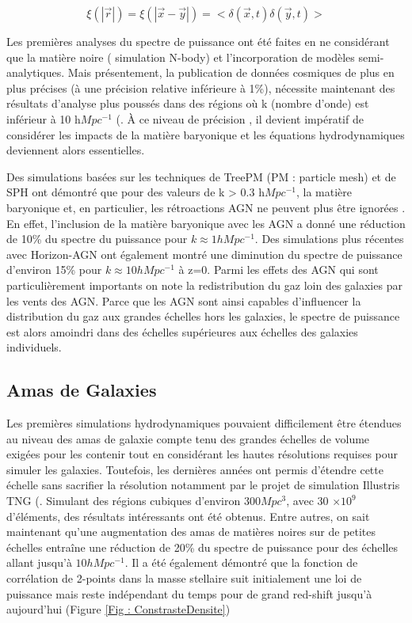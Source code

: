 \documentclass{article}
\begin{document}
\[ \xi(|\overrightarrow{r}|)  = \xi(|\overrightarrow{x}-\overrightarrow{y}|)  =  <\delta(\overrightarrow{x},t) \delta(\overrightarrow{y},t)>   \]


      
Les premières analyses du spectre de puissance ont été faites en  ne considérant que la matière noire ( simulation N-body)  et l'incorporation de modèles semi-analytiques. Mais présentement, la publication de données cosmiques de plus en plus précises (à une précision relative inférieure à 1\%), nécessite maintenant des résultats d’analyse plus poussés dans des régions où k (nombre d’onde) est inférieur à 10 h$Mpc^{-1}$ (\cite{Chisari_2018}.  À ce niveau de précision , il devient impératif de considérer les impacts de la matière baryonique et les équations hydrodynamiques deviennent alors essentielles.

Des simulations basées sur les techniques de TreePM (PM : particle mesh) et de SPH ont démontré que pour des valeurs de k > 0.3 h$Mpc^{-1}$, la matière baryonique et, en particulier, les rétroactions AGN ne peuvent plus être ignorées \citep{van_Daalen_2011}.  En effet, l'inclusion de la matière baryonique avec les AGN a donné une réduction de 10\% du spectre du puissance pour $k \approx 1 hMpc^{-1}$. Des simulations plus récentes avec Horizon-AGN \cite{Chisari_2018} ont également montré une diminution du spectre de puissance d’environ 15\% pour $k \approx 10 h Mpc^{-1} $ à z=0. Parmi les effets des AGN qui sont particulièrement importants on note la redistribution du gaz loin des galaxies par les vents des AGN. Parce que les AGN sont ainsi capables d'influencer la distribution du gaz aux grandes échelles hors les galaxies, le spectre de puissance est alors amoindri dans des échelles supérieures aux échelles des galaxies individuels.

\subsection{ Amas de Galaxies}

Les premières simulations hydrodynamiques pouvaient difficilement être étendues au niveau des amas de galaxie compte tenu des grandes  échelles de volume exigées pour les contenir tout en considérant les hautes résolutions requises pour simuler les galaxies. Toutefois, les dernières années ont permis d'étendre cette échelle sans sacrifier la résolution notamment par le projet de simulation Illustris TNG (\cite{Springel_2017}. Simulant des régions cubiques d'environ $300 Mpc^3$, avec 30 $\times 10^9$ d'éléments, des résultats intéressants ont été obtenus. 
Entre autres, on sait maintenant qu'une augmentation des amas de matières noires sur de petites échelles entraîne une réduction de 20\% du spectre de puissance pour des échelles allant jusqu'à $10hMpc^{-1}$. Il a été également démontré que la fonction de corrélation de 2-points dans la masse stellaire suit initialement une loi de puissance mais reste indépendant du temps pour de grand red-shift jusqu'à aujourd’hui (Figure \ref{Fig : ConstrasteDensite})
\end{document}
